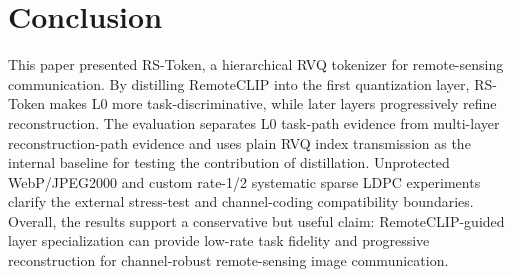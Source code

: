 \documentclass[lettersize,journal]{IEEEtran}
\begin{document}
\section{Conclusion}
This paper presented RS-Token, a hierarchical RVQ tokenizer for remote-sensing communication. By distilling RemoteCLIP into the first quantization layer, RS-Token makes L0 more task-discriminative, while later layers progressively refine reconstruction. The evaluation separates L0 task-path evidence from multi-layer reconstruction-path evidence and uses plain RVQ index transmission as the internal baseline for testing the contribution of distillation. Unprotected WebP/JPEG2000 and custom rate-1/2 systematic sparse LDPC experiments clarify the external stress-test and channel-coding compatibility boundaries. Overall, the results support a conservative but useful claim: RemoteCLIP-guided layer specialization can provide low-rate task fidelity and progressive reconstruction for channel-robust remote-sensing image communication.


\end{document}
